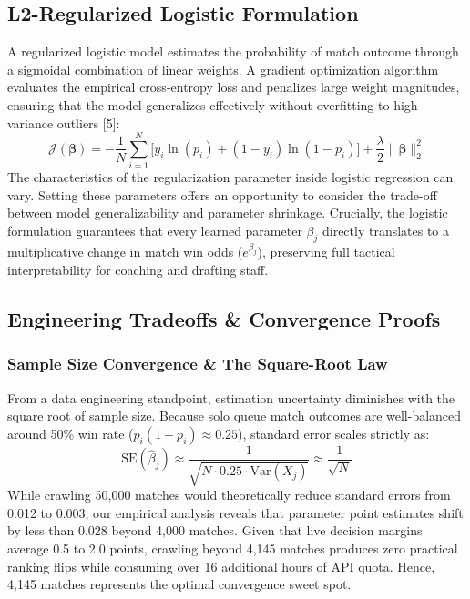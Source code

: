 \documentclass[11pt,letterpaper]{article}
\begin{document}
\subsection{L2-Regularized Logistic Formulation}

A regularized logistic model estimates the probability of match outcome through a sigmoidal combination of linear weights. A gradient optimization algorithm evaluates the empirical cross-entropy loss and penalizes large weight magnitudes, ensuring that the model generalizes effectively without overfitting to high-variance outliers [5]:
\vspace{-0.3em}
\begin{equation}
\mathcal{J}(\boldsymbol{\beta}) = - \frac{1}{N} \sum_{i=1}^N \Big[ y_i \ln(p_i) + (1 - y_i) \ln(1 - p_i) \Big] + \frac{\lambda}{2} \|\boldsymbol{\beta}\|_2^2
\end{equation}
\vspace{-0.3em}
The characteristics of the regularization parameter inside logistic regression can vary. Setting these parameters offers an opportunity to consider the trade-off between model generalizability and parameter shrinkage. Crucially, the logistic formulation guarantees that every learned parameter $\beta_j$ directly translates to a multiplicative change in match win odds ($e^{\beta_j}$), preserving full tactical interpretability for coaching and drafting staff.

\subsection{Engineering Tradeoffs \& Convergence Proofs}

\subsubsection{Sample Size Convergence \& The Square-Root Law}

From a data engineering standpoint, estimation uncertainty diminishes with the square root of sample size. Because solo queue match outcomes are well-balanced around 50\% win rate ($p_i(1 - p_i) \approx 0.25$), standard error scales strictly as:
\vspace{-0.3em}
\begin{equation}
\text{SE}(\hat{\beta}_j) \approx \frac{1}{\sqrt{N \cdot 0.25 \cdot \text{Var}(X_j)}} \approx \frac{1}{\sqrt{N}}
\end{equation}
\vspace{-0.3em}
While crawling 50,000 matches would theoretically reduce standard errors from 0.012 to 0.003, our empirical analysis reveals that parameter point estimates shift by less than 0.028 beyond 4,000 matches. Given that live decision margins average 0.5 to 2.0 points, crawling beyond 4,145 matches produces zero practical ranking flips while consuming over 16 additional hours of API quota. Hence, 4,145 matches represents the optimal convergence sweet spot.
\end{document}
